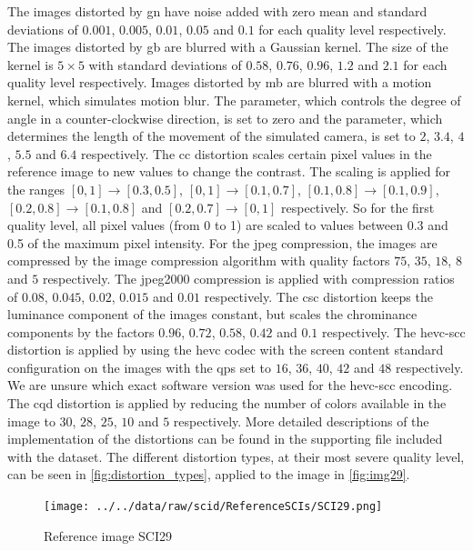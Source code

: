 The images distorted by \gls{gn} have noise added with zero mean and standard deviations of $0.001$, $0.005$, $0.01$, $0.05$ and $0.1$ for each quality level respectively.
The images distorted by \gls{gb} are blurred with a Gaussian kernel.
The size of the kernel is $5\times5$ with standard deviations of $0.58$, $0.76$, $0.96$, $1.2$ and $2.1$ for each quality level respectively.
Images distorted by \gls{mb} are blurred with a motion kernel, which simulates motion blur.
The parameter, which controls the degree of angle in a counter-clockwise direction, is set to zero and the parameter, which determines the length of the movement of the simulated camera, is set to $2$, $3.4$, $4$, $5.5$ and $6.4$ respectively.
The \gls{cc} distortion scales certain pixel values in the reference image to new values to change the contrast.
The scaling is applied for the ranges $[0,1] \rightarrow [0.3,0.5]$, $[0,1] \rightarrow [0.1,0.7]$, $[0.1,0.8] \rightarrow [0.1,0.9]$, $[0.2,0.8] \rightarrow [0.1,0.8]$ and $[0.2,0.7] \rightarrow [0,1]$ respectively.
So for the first quality level, all pixel values (from 0 to 1) are scaled to values between 0.3 and 0.5 of the maximum pixel intensity.
For the \gls{jpeg} compression, the images are compressed by the image compression algorithm with quality factors $75$, $35$, $18$, $8$ and $5$ respectively.
The \gls{jpeg}2000 compression is applied with compression ratios of $0.08$, $0.045$, $0.02$, $0.015$ and $0.01$ respectively.
The \gls{csc} distortion keeps the luminance component of the images constant, but scales the chrominance components by the factors $0.96$, $0.72$, $0.58$, $0.42$ and $0.1$ respectively.
The \gls{hevc}-\gls{scc} distortion is applied by using the \gls{hevc} codec with the screen content standard configuration on the images with the \glspl{qp} set to $16$, $36$, $40$, $42$ and $48$ respectively.
We are unsure which exact software version was used for the \gls{hevc}-\gls{scc} encoding.
The \gls{cqd} distortion is applied by reducing the number of colors available in the image to $30$, $28$, $25$, $10$ and $5$ respectively.
More detailed descriptions of the implementation of the distortions can be found in the supporting file included with the dataset.
The different distortion types, at their most severe quality level, can be seen in \autoref{fig:distortion_types}, applied to the image in \autoref{fig:img29}.

\begin{figure}
    \centering
    \texttt{[image: ../../data/raw/scid/ReferenceSCIs/SCI29.png]}
    \caption{Reference image SCI29}
    \label{fig:img29}
\end{figure}

